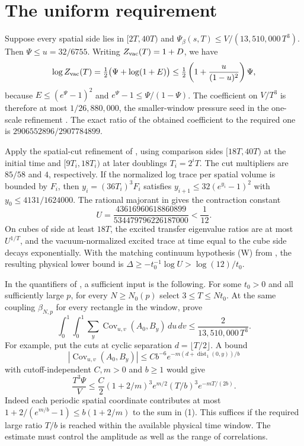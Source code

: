 \documentclass[11pt]{amsart}
\newcommand{\Cov}{\operatorname{Cov}}
\begin{document}
\section{The uniform requirement}

Suppose every spatial side lies in \([2T,40T)\) and
\(\Psi_\beta(s,T)\le V/(13{,}510{,}000\,T^3)\).
Then \(\Psi\le u=32/6755\). Writing \(Z_{\rm vac}(T)=1+D\), we have
\[
 \log Z_{\rm vac}(T)
 =\tfrac12\bigl(\Psi+\log(1+E)\bigr)
 \le \tfrac12\left(1+\frac{u}{(1-u)^2}\right)\Psi,
\]
because \(E\le (e^\Psi-1)^2\) and \(e^\Psi-1\le\Psi/(1-\Psi)\).
The coefficient on \(V/T^3\) is therefore at most \(1/26{,}880{,}000\),
the smaller-window pressure seed in the one-scale refinement \cite{Ann}.
The exact ratio of the obtained coefficient to the required one is
\(2906552896/2907784899\).

Apply the spatial-cut refinement of \cite{Ann}, using comparison sides
\([18T,40T)\) at the initial time and \([9T_i,18T_i)\) at later
doublings \(T_i=2^iT\). The cut multipliers are \(85/58\) and \(4\),
respectively. If the normalized log trace per spatial volume is bounded
by \(F_i\), then \(y_i=(36T_i)^3F_i\) satisfies
\(y_{i+1}\le32(e^{y_i}-1)^2\) with \(y_0\le4131/1624000\).
The rational majorant in \cite{Ann} gives the contraction constant
\[
U=\frac{43616960618860899}{534479796226187000}<\frac1{12}.
\]
On cubes of side at least \(18T\), the excited transfer eigenvalue
ratios are at most \(U^{1/T}\), and the vacuum-normalized excited
trace at time equal to the cube side decays exponentially. With the
matching continuum hypothesis (W) from \cite{OneScale}, the resulting
physical lower bound is \(\Delta\ge -t_0^{-1}\log U>\log(12)/t_0\).

In the quantifiers of \cite[Theorem F]{OneScale}, a sufficient input is the
following. For some \(t_0>0\) and all sufficiently large \(p\), for every
\(N\ge N_0(p)\) select \(3\le T\le Nt_0\). At the same coupling
\(\beta_{N,p}\) for every rectangle in the window, prove
\[
 \int_0^1\!\!\int_0^1 \sum_y
         \Cov_{u,v}(A_0,B_y)\,du\,dv
       \le \frac{2}{13{,}510{,}000\,T^3}.                 \tag{3}
\]
For example, put the cuts at cyclic separation \(d=\lfloor T/2\rfloor\).
A bound
\[
 |\Cov_{u,v}(A_0,B_y)|\le
 C b^{-6}e^{-m(d+\operatorname{dist}_1(0,y))/b}
\]
with cutoff-independent \(C,m>0\) and \(b\ge1\) would give
\[
 \frac{T^3\Psi}{V}\le \frac C2 (1+2/m)^3 e^{m/2}(T/b)^3e^{-mT/(2b)}.
\]
Indeed each periodic spatial coordinate contributes at most
\(1+2/(e^{m/b}-1)\le b(1+2/m)\) to the sum in (1).
This suffices if the required large ratio \(T/b\) is reached within the
available physical time window. The estimate must control the amplitude
as well as the range of correlations.
\end{document}
